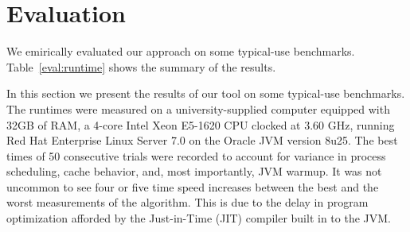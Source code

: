 \section{Evaluation}
\label{sec:evaluation}


We emirically evaluated our approach on some typical-use
benchmarks. Table~\ref{eval:runtime} shows the summary of the results. 



In this section we present the results of our tool on some typical-use
benchmarks. The runtimes were measured on a university-supplied
computer equipped with 32GB of RAM, a 4-core Intel Xeon E5-1620 CPU
clocked at 3.60 GHz, running Red Hat Enterprise Linux Server 7.0 on
the Oracle JVM version 8u25. The best times of 50 consecutive trials
were recorded to account for variance in process scheduling, cache
behavior, and, most importantly, JVM warmup. It was not uncommon to
see four or five time speed increases between the best and the worst
measurements of the algorithm. This is due to the delay in program
optimization afforded by the Just-in-Time (JIT) compiler built in to
the JVM.

